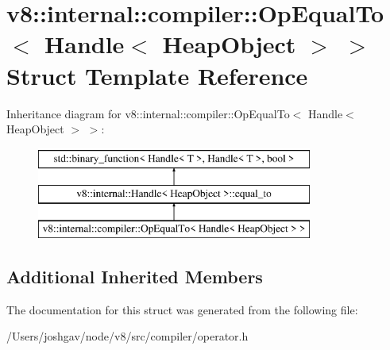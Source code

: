 \hypertarget{structv8_1_1internal_1_1compiler_1_1_op_equal_to_3_01_handle_3_01_heap_object_01_4_01_4}{}\section{v8\+:\+:internal\+:\+:compiler\+:\+:Op\+Equal\+To$<$ Handle$<$ Heap\+Object $>$ $>$ Struct Template Reference}
\label{structv8_1_1internal_1_1compiler_1_1_op_equal_to_3_01_handle_3_01_heap_object_01_4_01_4}
Inheritance diagram for v8\+:\+:internal\+:\+:compiler\+:\+:Op\+Equal\+To$<$ Handle$<$ Heap\+Object $>$ $>$\+:\begin{figure}[H]
\begin{center}
\leavevmode
\includegraphics[height=3.000000cm]{structv8_1_1internal_1_1compiler_1_1_op_equal_to_3_01_handle_3_01_heap_object_01_4_01_4}
\end{center}
\end{figure}
\subsection*{Additional Inherited Members}


The documentation for this struct was generated from the following file\+:\begin{DoxyCompactItemize}
\item 
/\+Users/joshgav/node/v8/src/compiler/operator.\+h\end{DoxyCompactItemize}
